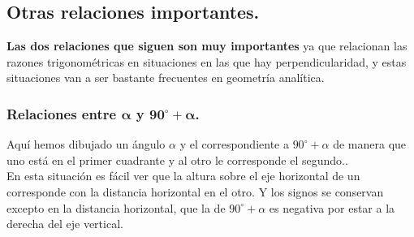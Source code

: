 \documentclass[a4paper,11pt,answers]{exam}
\newcommand{\degree}{^\circ}
\begin{document}
\subsection{Otras relaciones importantes.}
\textbf{Las dos relaciones que siguen son muy importantes} ya que relacionan las razones
trigonométricas en situaciones en las que hay perpendicularidad, y estas situaciones van
a ser bastante frecuentes en geometría analítica.

\subsubsection{\texorpdfstring{Relaciones entre $\boldsymbol{\alpha}$ y $\boldsymbol{90\degree + \alpha}$.}{Relaciones entre $\alpha$  y 90\textdegree + $alpha$.}}
Aquí hemos dibujado un ángulo $\alpha$ y el correspondiente a $90\degree + \alpha$ de manera que
uno está en el primer cuadrante y al otro le corresponde el segundo..\\
En esta situación es fácil ver que la altura sobre el eje horizontal de un corresponde con la
distancia horizontal en el otro. Y los signos se conservan excepto en la distancia horizontal, que
la de $90\degree + \alpha$ es negativa por estar a la derecha del eje vertical.
\end{document}

